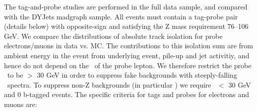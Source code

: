 The tag-and-probe studies are performed in the full data sample, and compared with the DYJets madgraph sample.
All events must contain a tag-probe pair (details below) with opposite-sign and satisfying the Z mass requirement 76--106 GeV.
We compare the distributions of absolute track isolation for probe electrons/muons in data vs. MC. The contributions to
this isolation sum are from ambient energy in the event from underlying event, pile-up and jet activitiy, and hence do
not depend on the \pt\ of the probe lepton. We therefore restrict the probe \pt\ to be $>$ 30 GeV in order to suppress
fake backgrounds with steeply-falling \pt\ spectra. To suppress non-Z backgrounds (in particular \ttbar) we require 
\met\ $<$ 30 GeV and 0 b-tagged events. 
The specific criteria for tags and probes for electrons and muons are:




